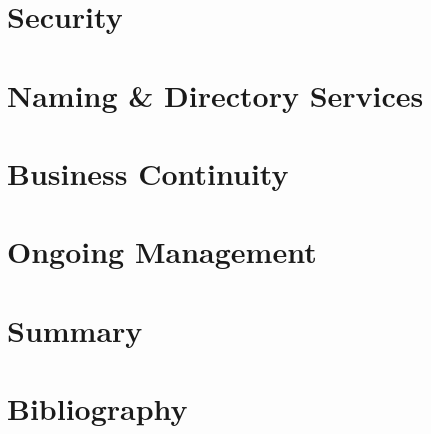 \documentclass[a4paper, twoside]{article}
\begin{document}
\section{Security}

\section{Naming \& Directory Services}

\section{Business Continuity}

\section{Ongoing Management}

\section{Summary}

\section{Bibliography}
\end{document}
